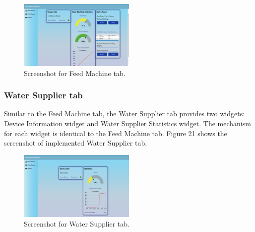 \documentclass[conference]{IEEEtran}
\begin{document}
\begin{figure}[htbp]
\centerline{\includegraphics[width=0.5\textwidth]{./images/feed_machine_ui.png}}
\caption{Screenshot for Feed Machine tab.}
\label{fig}
\end{figure}

\subsubsection{Water Supplier tab}
Similar to the Feed Machine tab, the Water Supplier tab provides two widgets: Device Information widget and Water Supplier Statistics widget. The mechanism for each widget is identical to the Feed Machine tab. Figure 21
shows the screenshot of implemented Water Supplier tab.

\begin{figure}[htbp]
\centerline{\includegraphics[width=0.5\textwidth]{./images/water_supplier_ui.png}}
\caption{Screenshot for Water Supplier tab.}
\label{fig}
\end{figure}
\end{document}
